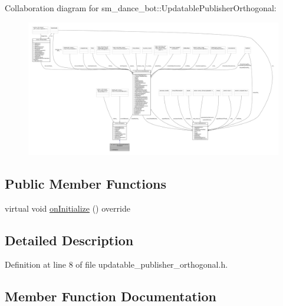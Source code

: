 Collaboration diagram for sm\+\_\+dance\+\_\+bot\+:\+:Updatable\+Publisher\+Orthogonal\+:
\nopagebreak
\begin{figure}[H]
\begin{center}
\leavevmode
\includegraphics[width=350pt]{classsm__dance__bot_1_1UpdatablePublisherOrthogonal__coll__graph}
\end{center}
\end{figure}
\subsection*{Public Member Functions}
\begin{DoxyCompactItemize}
\item 
virtual void \hyperlink{classsm__dance__bot_1_1UpdatablePublisherOrthogonal_af15b10bcebf79adc4d5bd85de808b13a}{on\+Initialize} () override
\end{DoxyCompactItemize}


\subsection{Detailed Description}


Definition at line 8 of file updatable\+\_\+publisher\+\_\+orthogonal.\+h.



\subsection{Member Function Documentation}
